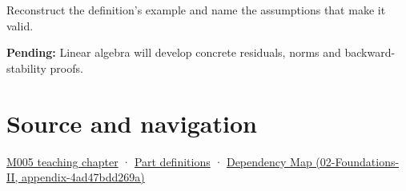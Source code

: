 Reconstruct the definition's example and name the assumptions that make it valid.

\textbf{Pending:} Linear algebra will develop concrete residuals, norms and backward-stability proofs.

\section{Source and navigation}\label{appendix-a7fbaf6d1b1c-source-and-navigation}

\href{Continuous\%20Notes/Computing\%20Foundations\%20-\%20From\%20Bits\%20to\%20C++\%20and\%20Systems\%20APIs\#When\%20arithmetic\%20meets\%20uncertainty}{M005 teaching chapter} · \hyperref[appendix-fd090d982a15-m005---parts-77-88]{Part definitions} · \href{../02-Foundations-II/main.pdf\#nameddest=appendix-4ad47bdd269a}{Dependency Map (02-Foundations-II, appendix-4ad47bdd269a)}
